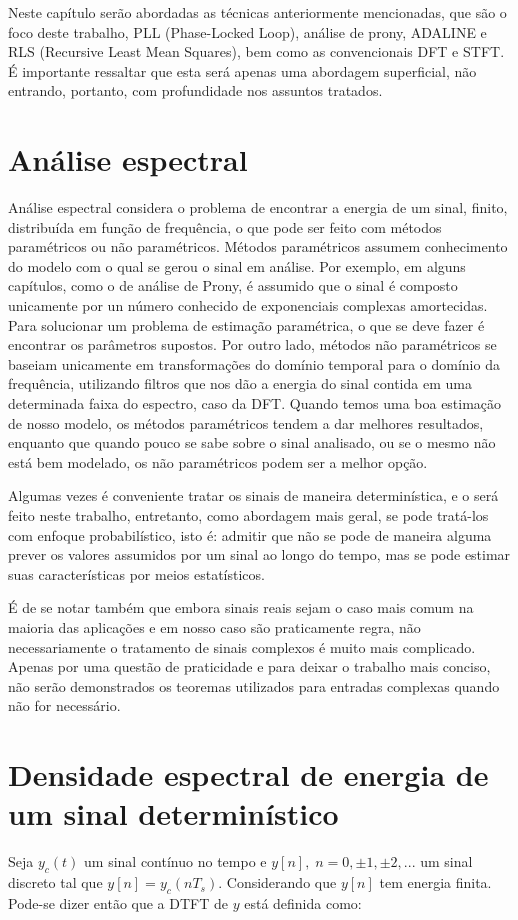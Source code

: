 
Neste capítulo serão abordadas as técnicas anteriormente mencionadas, que são o foco deste trabalho, PLL (Phase-Locked Loop), análise de prony, ADALINE e RLS (Recursive Least Mean Squares), bem como as convencionais DFT e STFT. É importante ressaltar que esta será apenas uma abordagem superficial, não entrando, portanto, com profundidade nos assuntos tratados.

\section{Análise espectral}
Análise espectral considera o problema de encontrar a energia de um sinal, finito, distribuída em função de frequência, o que pode ser feito com métodos paramétricos ou não paramétricos. Métodos paramétricos assumem conhecimento do modelo com o qual se gerou o sinal em análise. Por exemplo, em alguns capítulos, como o de análise de Prony, é assumido que o sinal é composto unicamente por un número conhecido de exponenciais complexas amortecidas. Para solucionar um problema de estimação paramétrica, o que se deve fazer é encontrar os parâmetros supostos. Por outro lado, métodos não paramétricos se baseiam unicamente em transformações do domínio temporal para o domínio da frequência, utilizando filtros que nos dão a energia do sinal contida em uma determinada faixa do espectro, caso da DFT. Quando temos uma boa estimação de nosso modelo, os métodos paramétricos tendem a dar melhores resultados, enquanto que quando pouco se sabe sobre o sinal analisado, ou se o mesmo não está bem modelado, os não paramétricos podem ser a melhor opção.

\indent Algumas vezes é conveniente tratar os sinais de maneira determinística, e o será feito neste trabalho, entretanto, como abordagem mais geral, se pode tratá-los com enfoque probabilístico, isto é: admitir que não se pode de maneira alguma prever os valores assumidos por um sinal ao longo do tempo, mas se pode estimar suas características por meios estatísticos.

\indent É de se notar também que embora sinais reais sejam o caso mais comum na maioria das aplicações e em nosso caso são praticamente regra, não necessariamente o tratamento de sinais complexos é muito mais complicado. Apenas por uma questão de praticidade e para deixar o trabalho mais conciso, não serão demonstrados os teoremas utilizados para entradas complexas quando não for necessário.\cite{stoica2005spectral}

\section{Densidade espectral de energia de um sinal determinístico}
Seja $y_c(t)$ um sinal contínuo no tempo e $y[n], \; n=0, \pm 1, \pm 2,...$  um sinal discreto tal que $y[n]=y_c(nT_s)$. Considerando que $y[n]$ tem energia finita. Pode-se dizer então que a DTFT de $y$ está definida como:


